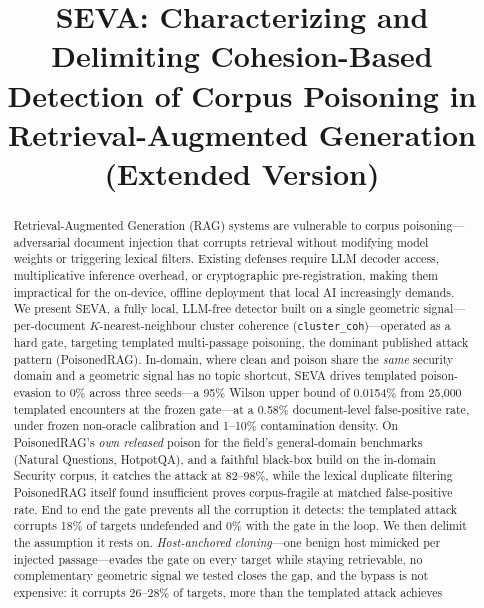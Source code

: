 \documentclass[10pt,journal,compsoc]{IEEEtran}
\begin{document}
\title{SEVA: Characterizing and Delimiting Cohesion-Based
Detection of Corpus Poisoning in Retrieval-Augmented Generation\\[2pt]
\large\normalfont(Extended Version)}

\author{
}

\maketitle

\begin{abstract}
Retrieval-Augmented Generation (RAG) systems are vulnerable to corpus
poisoning---adversarial document injection that corrupts retrieval without
modifying model weights or triggering lexical filters. Existing defenses
require LLM decoder access, multiplicative inference overhead, or cryptographic
pre-registration, making them impractical for the on-device, offline deployment
that local AI increasingly demands. We present SEVA, a fully local, LLM-free
detector built on a single geometric signal---per-document $K$-nearest-neighbour
cluster coherence (\texttt{cluster\_coh})---operated as a hard gate, targeting
templated multi-passage poisoning, the dominant published attack pattern
(PoisonedRAG). In-domain, where clean and poison share the \emph{same} security domain
and a geometric signal has no topic shortcut, SEVA drives templated poison-evasion to
0\% across three seeds---a 95\% Wilson upper bound of 0.0154\% from 25{,}000 templated
encounters at the frozen gate---at a 0.58\% document-level false-positive rate, under
frozen non-oracle calibration and 1--10\% contamination density. On PoisonedRAG's
\emph{own released} poison for the field's general-domain benchmarks (Natural Questions,
HotpotQA), and a faithful black-box build on the in-domain Security corpus, it catches
the attack at 82--98\%, while the lexical duplicate filtering PoisonedRAG itself found
insufficient proves corpus-fragile at matched false-positive rate. End to end the gate prevents
all the corruption it detects: the templated attack corrupts 18\% of targets undefended and 0\%
with the gate in the loop. We then delimit the assumption it rests on. \emph{Host-anchored
cloning}---one benign host mimicked per injected passage---evades the gate on every target while
staying retrievable, no complementary geometric signal we tested closes the gap, and the bypass
is not expensive: it corrupts 26--28\% of targets, more than the templated attack achieves

\end{abstract}
\end{document}
